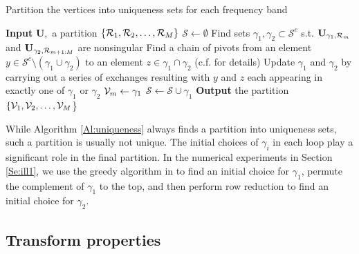 \documentclass[journal, 10pt]{IEEEtran}
\begin{document}
\begin{algorithm}[tb] 
\caption{Partition the vertices into uniqueness sets for each frequency band}
\begin{algorithmic}
\State \textbf{Input} $\mathbf{U}$,~a partition $\{{{\cal R}_1,{\cal R}_2,\ldots,{\cal R}_M}\}$ %
\State $\mathcal{S} \gets \emptyset$
\State Find sets $\gamma_1, \gamma_2 \subset {\mathcal{S}}^c$ s.t. $\mathbf{U}_{\gamma_1,{\cal R}_m}$ and $\mathbf{U}_{\gamma_2,{\cal R}_{m+1:M}}$ are nonsingular
\While {$\gamma_1 \cap \gamma_2 \neq \emptyset$}
\State Find a chain of pivots from an element $y \in {\mathcal S}^c \setminus (\gamma_1 \cup \gamma_2)$
to an element $z \in \gamma_1 \cap \gamma_2$ (c.f. \cite{greene_magnanti} for details)
\State Update $\gamma_1$ and $\gamma_2$ by carrying out a series of exchanges resulting with $y$ and $z$ each appearing in exactly one of $\gamma_1$ or $\gamma_2$
\EndWhile
\State ${\mathcal{V}}_m \gets \gamma_1$%
\State $\mathcal{S} \gets \mathcal{S} \cup \gamma_1$ %
\EndFor
\State \textbf{Output} the partition $\{{\mathcal{V}}_1,{\mathcal{V}}_2,\ldots,{\mathcal{V}}_M$\}
\end{algorithmic}
\label{Al:uniqueness}
\end{algorithm}

\begin{remark}
While Algorithm \ref{Al:uniqueness} always finds a partition into uniqueness sets, such a partition is usually not unique. The initial choices of $\gamma_i$ in each loop play a significant role in the final 
partition. In the numerical experiments in Section \ref{Se:ill1}, we use the greedy algorithm in \cite[Algorithm 1]{shomorony}  to find an initial choice for $\gamma_1$, %
permute the complement of $\gamma_1$ to the top,
and then perform row reduction 
to find an initial choice for $\gamma_2$.  %
\end{remark}




\subsection{Transform properties}
\end{document}

